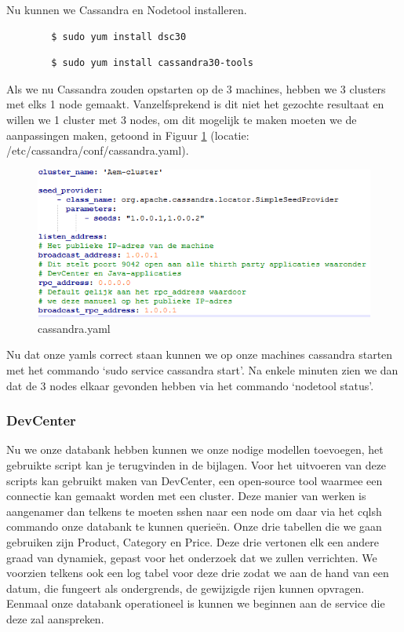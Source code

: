 \documentclass{article}
\begin{document}
	\par
	Nu kunnen we Cassandra en Nodetool installeren.
	\begin{lstlisting}
		$ sudo yum install dsc30
	\end{lstlisting}
	\begin{lstlisting}
		$ sudo yum install cassandra30-tools
	\end{lstlisting}
	
	\par
	Als we nu Cassandra zouden opstarten op de 3 machines, hebben we 3 clusters met elks 1 node gemaakt. 
	Vanzelfsprekend is dit niet het gezochte resultaat en willen we 1 cluster met 3 nodes, om dit mogelijk te maken moeten we de aanpassingen maken, getoond in Figuur \ref{fig:cassandra.yaml} (locatie: /etc/cassandra/conf/cassandra.yaml).
	\begin{figure}[h!]
  		\includegraphics[width=\linewidth]{images/cassandra-yaml.PNG}
  		\caption{cassandra.yaml}
  		\label{fig:cassandra.yaml}
	\end{figure}
	
	\par
	Nu dat onze yamls correct staan kunnen we op onze machines cassandra starten met het commando ‘sudo service cassandra start’. 
	Na enkele minuten zien we dan dat de 3 nodes elkaar gevonden hebben via het commando ‘nodetool status’.
	
	\par
	\subsubsection{DevCenter}
	 Nu we onze databank hebben kunnen we onze nodige modellen toevoegen, het gebruikte script kan je terugvinden in de bijlagen.
	 Voor het uitvoeren van deze scripts kan gebruikt maken van DevCenter, een open-source tool waarmee een connectie kan gemaakt worden met een cluster. 
	 Deze manier van werken is aangenamer dan telkens te moeten sshen naar een node om daar via het cqlsh commando onze databank te kunnen querieën. 
	 Onze drie tabellen die we gaan gebruiken zijn Product, Category en Price. 
	 Deze drie vertonen elk een andere graad van dynamiek, gepast voor het onderzoek dat we zullen verrichten.
	 We voorzien telkens ook een log tabel voor deze drie zodat we aan de hand van een datum, die fungeert als ondergrends, de gewijzigde rijen kunnen opvragen.
	 Eenmaal onze databank operationeel is kunnen we beginnen aan de service die deze zal aanspreken.
\end{document}
